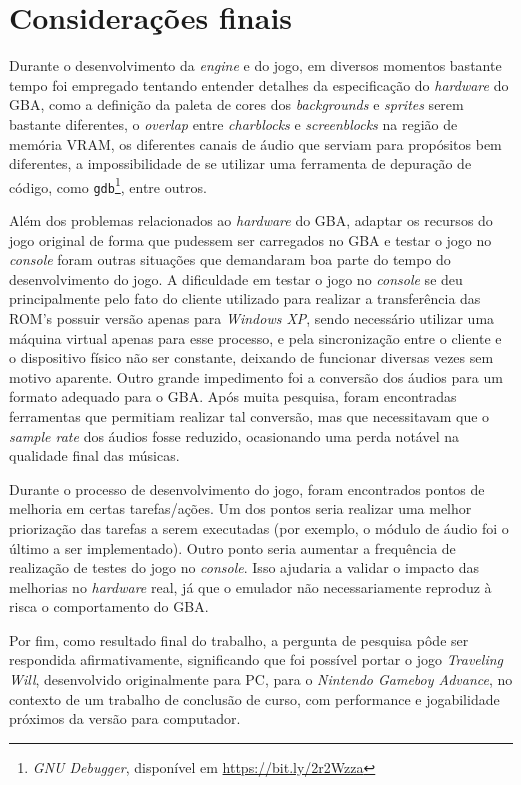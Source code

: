 \chapter[Considerações finais]{Considerações finais}

Durante o desenvolvimento da \textit{engine} e do jogo, em diversos momentos bastante tempo foi empregado tentando entender detalhes da especificação do \textit{hardware} do GBA, como a definição da paleta de cores dos \textit{backgrounds} e \textit{sprites} serem bastante diferentes, o \textit{overlap} entre \textit{charblocks} e \textit{screenblocks} na região de memória VRAM, os diferentes canais de áudio que serviam para propósitos bem diferentes, a impossibilidade de se utilizar uma ferramenta de depuração de código, como \texttt{gdb}\footnote{\textit{GNU Debugger}, disponível em \url{https://bit.ly/2r2Wzza}}, entre outros.

Além dos problemas relacionados ao \textit{hardware} do GBA, adaptar os recursos do jogo original de forma que pudessem ser carregados no GBA e testar o jogo no \textit{console} foram outras situações que demandaram boa parte do tempo do desenvolvimento do jogo. A dificuldade em testar o jogo no \textit{console} se deu principalmente pelo fato do cliente utilizado para realizar a transferência das ROM's possuir versão apenas para \textit{Windows XP}, sendo necessário utilizar uma máquina virtual apenas para esse processo, e pela sincronização entre o cliente e o dispositivo físico não ser constante, deixando de funcionar diversas vezes sem motivo aparente. Outro grande impedimento foi a conversão dos áudios para um formato adequado para o GBA. Após muita pesquisa, foram encontradas ferramentas que permitiam realizar tal conversão, mas que necessitavam que o \textit{sample rate} dos áudios fosse reduzido, ocasionando uma perda notável na qualidade final das músicas. 

Durante o processo de desenvolvimento do jogo, foram encontrados pontos de melhoria em certas tarefas/ações. Um dos pontos seria realizar uma melhor priorização das tarefas a serem executadas (por exemplo, o módulo de áudio foi o último a ser implementado). Outro ponto seria aumentar a frequência de realização de testes do jogo no \textit{console}. Isso ajudaria a validar o impacto das melhorias no \textit{hardware} real, já que o emulador não necessariamente reproduz à risca o comportamento do GBA.

Por fim, como resultado final do trabalho, a pergunta de pesquisa pôde ser respondida afirmativamente, significando que foi possível portar o jogo \textit{Traveling Will}, desenvolvido originalmente para PC, para o \textit{Nintendo Gameboy Advance}, no contexto de um trabalho de conclusão de curso, com performance e jogabilidade próximos da versão para computador.

